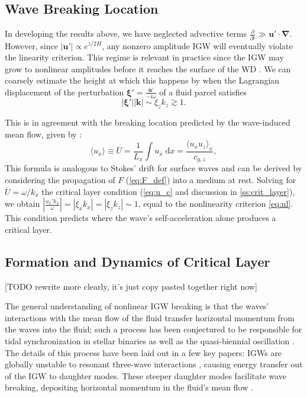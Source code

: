 \documentclass[
        fleqn,
        usenatbib,
    ]{mnras}
\newcommand*{\pd}[2]{\frac{\partial#1}{\partial#2}}
\newcommand*{\abs}[1]{\left|#1\right|}
\newcommand*{\ev}[1]{\langle#1\rangle}
\newcommand*{\bm}[1]{\boldsymbol{\mathbf{#1}}}
\begin{document}
\subsection{Wave Breaking Location}\label{ss:wave_breaking}

In developing the results above, we have neglected advective terms $\pd{}{t} \gg
\bm{u}' \cdot \bm{\nabla}$. However, since $\abs{\bm{u}'} \propto
e^{z/2H}$, any nonzero amplitude IGW will eventually violate the linearity
criterion. This regime is relevant in practice since the IGW may grow to
nonlinear amplitudes before it reaches the surface of the WD
\citep{fullerI,fullerII}. We can coarsely estimate the height at which this
happens by when the Lagrangian displacement of the perturbation $\bm{\xi}' =
\frac{\bm{u}'}{-i\omega}$ of a fluid parcel satisfies
\begin{equation}
    \abs{\bm{\xi}'} \abs{\bm{k}} \sim \xi_z k_z \gtrsim 1.\label{eq:nl}
\end{equation}

This is in agreement with the breaking location predicted by the wave-induced
mean flow, given by \citep{eliassen_palm_cite,sutherland0}:
\begin{equation}
     \ev{u_{x}} \equiv \overline{U} = \frac{1}{L_x}
        \int\limits u_{x}\;\mathrm{d}x = \frac{\ev{u_{x}u_{z}}_x}{c_{g,z}},
        \label{eq:mean_flow}
\end{equation}
This formula is analogous to Stokes' drift for surface waves and can be derived
by considering the propagation of $F$ (\autoref{eq:F_def}) into a medium at
rest. Solving for $\overline{U} = \omega / k_x$ the critical layer condition
(\autoref{eq:u_c} and discussion in \autoref{ss:crit_layer}), we obtain
$\abs{\frac{u_{x}'k_{x}}{\omega}} = \abs{\xi_x k_{x}} = \abs{\xi_z k_z} \sim 1$,
equal to the nonlinearity criterion \autoref{eq:nl}. This condition predicts
where the wave's self-acceleration alone produces a critical layer.

\subsection{Formation and Dynamics of Critical Layer}\label{ss:crit_layer}

[TODO rewrite more clearly, it's just copy pasted together right now]

The general understanding of nonlinear IGW breaking is that the waves'
interactions with the mean flow of the fluid transfer horizontal momentum from
the waves into the fluid; such a process has been conjectured to be responsible
for tidal synchronization in stellar binaries \citep{zahn75,gn89} as well as the
quasi-biennial oscillation \citep{lindzen_qbo}. The details of this process have
been laid out in a few key papers: IGWs are globally unstable to resonant
three-wave interactions \citep{drazin}, causing energy transfer out of the IGW
to daughter modes. These steeper daughter modes facilitate wave breaking,
depositing horizontal momentum in the fluid's mean flow \citep{klostermeyer}.
\end{document}
